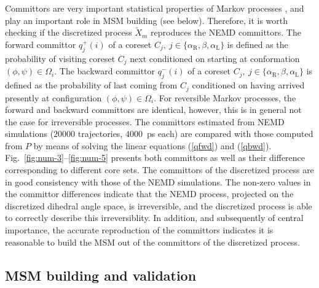 \documentclass[aps, pre, preprint,unsortedaddress,a4paper,onecolumn]{revtex4}
\newcommand{\fwd}[0]{+}
\newcommand{\bwd}[0]{-}
\newcommand{\confaa}[0]{{\alpha_{\textrm{R}}}}
\newcommand{\confc}[0]{{\alpha_{\textrm{L}}}}
\begin{document}
Committors are very important statistical properties of Markov processes \cite{PrinzHeldSmithNoe_Committorprep,PNAS09}, and play
an important role in MSM building \cite{A19-31,A19-29,djurdjevac2010markov} (see below). Therefore, it is worth
checking if the discretized process $\tilde X_m$ reproduces the NEMD committors.
The forward committor $q^\fwd_j(i)$ of a coreset $C_j,\
j\in\{\confaa, \beta, \confc\}$ is defined as the probability of
visiting coreset $C_j$ next conditioned on starting at conformation
$(\phi,\psi)\in\Omega_i$.  The backward committor $q^\bwd_j(i)$ of a
coreset $C_j,\ j\in\{\confaa, \beta, \confc\}$ is defined as the
probability of last coming from $C_j$ conditioned on having arrived presently at
configuration $(\phi,\psi)\in\Omega_i$.
For reversible Markov processes, the
forward and backward committors are identical, however, this is in
general not the case for irreversible processes.
The committors estimated from NEMD simulations ($20000$ trajectories, $4000$~ps each) are compared with
those computed from $P$ by means of solving the linear equations (\ref{qfwd}) and (\ref{qbwd}).
Fig.~\ref{fig:num-3}--\ref{fig:num-5} presents both
committors as well as their difference corresponding to different core sets.
The committors of the discretized process are in good consistency with those of
the NEMD simulations. The non-zero values in the committor differences
indicate that the NEMD process, projected on the discretized
dihedral angle space, is irreversible, and
the discretized process is able to correctly describe this irreversiblity.
In addition, and subsequently of central importance, the accurate reproduction of the committors indicates it is reasonable to build the 
MSM out of the committors of the  discretized process.



\subsection{MSM building and validation}
\end{document}
